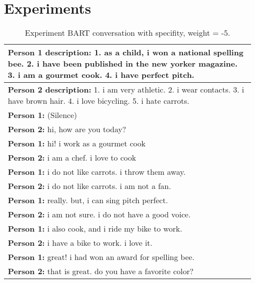 \chapter{Experiments} \label{experiments}

\begin{table}[H]
\centering
 \begin{tabular}{|p{14cm}|} 
 \hline
 \textbf{Person 1 description:} 1. as a child, i won a national spelling bee. 2. i have been published in the new yorker magazine. 3. i am a gourmet cook. 4. i have perfect pitch. \\
 \hline
 \textbf{Person 2 description:} 1. i am very athletic. 2. i wear contacts. 3. i have brown hair. 4. i love bicycling. 5. i hate carrots. \\
 \hline
 \textbf{Person 1:} (Silence) \\
 \textbf{Person 2:} hi, how are you today? \\ 
 \textbf{Person 1:} hi! i work as a gourmet cook \\
 \textbf{Person 2:} i am a chef. i love to cook \\
 \textbf{Person 1:} i do not like carrots. i throw them away. \\
 \textbf{Person 2:} i do not like carrots. i am not a fan. \\
 \textbf{Person 1:} really. but, i can sing pitch perfect. \\
 \textbf{Person 2:} i am not sure. i do not have a good voice. \\
 \textbf{Person 1:} i also cook, and i ride my bike to work. \\
 \textbf{Person 2:} i have a bike to work. i love it. \\
 \textbf{Person 1:} great! i had won an award for spelling bee. \\
 \textbf{Person 2:} that is great. do you have a favorite color? \\
 \hline
 \end{tabular}
 \caption{Experiment BART conversation with specifity, weight = -5.}
\label{tab:bart_conversation_idf-5_ap}
\end{table}


